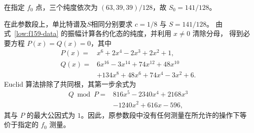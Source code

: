 在指定 $f_0$ 点，三个纯度依次为 $(63,39,39)/128$，故 $S_0=141/128$。

在此参数段上，单比特谱及$S$相同分别要求 $c=1/8$ 与 $S=141/128$。
由式~\eqref{low:f159-data} 的振幅计算各约化态的纯度，并利用 $x\ne0$ 清除分母，
得到必要方程 $P(x)=Q(x)=0$，其中
\begin{align}
 P(x)={}&x^6+2x^4-2x^3+2x^2+1,\nonumber\\
 Q(x)={}&6x^{16}-3x^{14}+74x^{12}+48x^{10}\nonumber\\
 &+134x^8+48x^6+74x^4-3x^2+6.
 \label{low:invariant-polynomials}
\end{align}
Euclid 算法排除了共同根，其第一步余式为
\begin{equation}
 \begin{aligned}
 Q\bmod P={}&816x^5-2340x^4+2168x^3\\
 &-1240x^2+616x-596,
 \end{aligned}
\end{equation}
其与 $P$ 的最大公因式为 $1$。因此，原参数段中没有任何测量在所允许的操作下等价于指定的 $f_0$ 测量。
